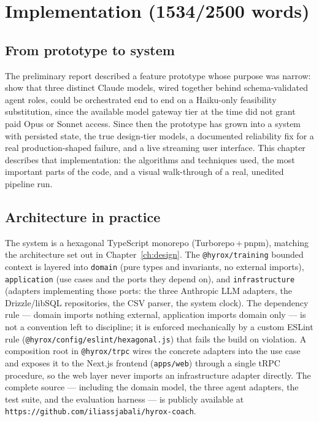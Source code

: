 
\chapter{Implementation (1534/2500 words)}
\label{ch:implementation}

\section{From prototype to system}

The preliminary report described a feature prototype whose purpose was narrow: show that three distinct Claude models, wired together behind schema-validated agent roles, could be orchestrated end to end on a Haiku-only feasibility substitution, since the available model gateway tier at the time did not grant paid Opus or Sonnet access. Since then the prototype has grown into a system with persisted state, the true design-tier models, a documented reliability fix for a real production-shaped failure, and a live streaming user interface. This chapter describes that implementation: the algorithms and techniques used, the most important parts of the code, and a visual walk-through of a real, unedited pipeline run.

\section{Architecture in practice}

The system is a hexagonal TypeScript monorepo (Turborepo\,+\,pnpm), matching the architecture set out in Chapter~\ref{ch:design}. The \texttt{@hyrox/training} bounded context is layered into \texttt{domain} (pure types and invariants, no external imports), \texttt{application} (use cases and the ports they depend on), and \texttt{infrastructure} (adapters implementing those ports: the three Anthropic LLM adapters, the Drizzle/libSQL repositories, the CSV parser, the system clock). The dependency rule --- domain imports nothing external, application imports domain only --- is not a convention left to discipline; it is enforced mechanically by a custom ESLint rule (\texttt{@hyrox/config/eslint/hexagonal.js}) that fails the build on violation. A composition root in \texttt{@hyrox/trpc} wires the concrete adapters into the use case and exposes it to the Next.js frontend (\texttt{apps/web}) through a single tRPC procedure, so the web layer never imports an infrastructure adapter directly. The complete source --- including the domain model, the three agent adapters, the test suite, and the evaluation harness --- is publicly available at \texttt{https://github.com/iliassjabali/hyrox-coach}.

